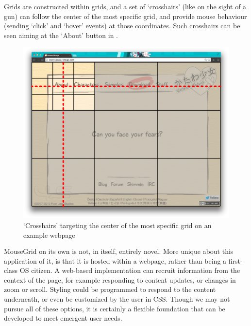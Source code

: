 \documentclass[11pt,openright,a4paper]{report}
\begin{document}
\FloatBarrier
Grids are constructed within grids, and a set of `crosshairs' (like on the sight of a gun) can follow the center of the most specific grid, and provide mouse behaviour (sending `click' and `hover' events) at those coordinates. Such crosshairs can be seen aiming at the `About' button in .

\begin{figure}[ht]
\centering\includegraphics[width=\textwidth]{figures/Crosshairs.png}
\caption{`Crosshairs' targeting the center of the most specific grid on an example webpage}
\label{fig:crosshairs}
\end{figure}

\FloatBarrier
MouseGrid on its own is not, in itself, entirely novel. More unique about this application of it, is that it is hosted within a webpage, rather than being a first-class OS citizen. A web-based implementation can recruit information from the context of the page, for example responding to content updates, or changes in zoom or scroll. Styling could be programmed to respond to the content underneath, or even be customized by the user in CSS. Though we may not pursue all of these options, it is certainly a flexible foundation that can be developed to meet emergent user needs.
\end{document}
